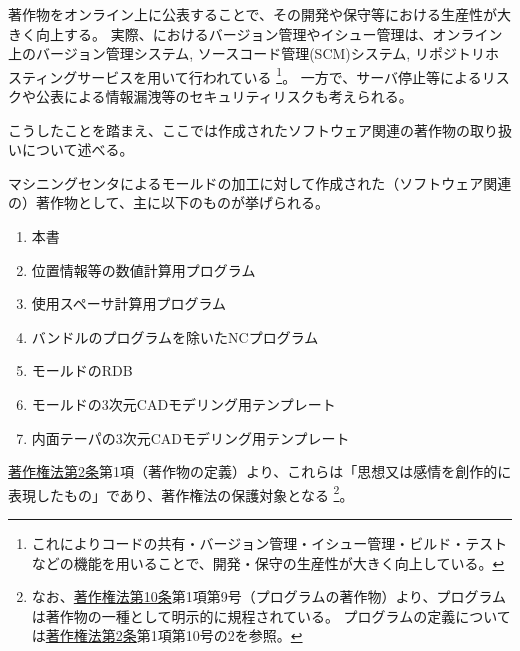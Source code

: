 

著作物をオンライン上に公表することで、その開発や保守等における生産性が大きく向上する。
実際、\DMname におけるバージョン管理やイシュー管理は、オンライン上のバージョン管理システム, ソースコード管理(SCM)システム, リポジトリホスティングサービスを用いて行われている
\footnote{これによりコードの共有・バージョン管理・イシュー管理・ビルド・テストなどの機能を用いることで、開発・保守の生産性が大きく向上している。}。
一方で、サーバ停止等によるリスクや公表による情報漏洩等のセキュリティリスクも考えられる。

こうしたことを踏まえ、ここでは作成されたソフトウェア関連の著作物の取り扱いについて述べる。



マシニングセンタによるモールドの加工に対して作成された（ソフトウェア関連の）著作物として、主に以下のものが挙げられる。
\begin{enumerate}
\item 本書
\item 位置情報等の数値計算用プログラム
\item 使用スペーサ計算用プログラム
\item バンドルのプログラムを除いたNCプログラム
\item モールドのRDB
\item モールドの3次元CADモデリング用テンプレート
\item 内面テーパの3次元CADモデリング用テンプレート
\end{enumerate}
\href{https://elaws.e-gov.go.jp/document?lawid=345AC0000000048#Mp-At_2}{著作権法第2条}第1項（著作物の定義）より、これらは「思想又は感情を創作的に表現したもの」であり、著作権法の保護対象となる
\footnote{なお、\href{https://elaws.e-gov.go.jp/document?lawid=345AC0000000048\#Mp-At_10}{著作権法第10条}第1項第9号（プログラムの著作物）より、プログラムは著作物の一種として明示的に規程されている。
プログラムの定義については\href{https://elaws.e-gov.go.jp/document?lawid=345AC0000000048\#Mp-At_2}{著作権法第2条}第1項第10号の2を参照。}。



